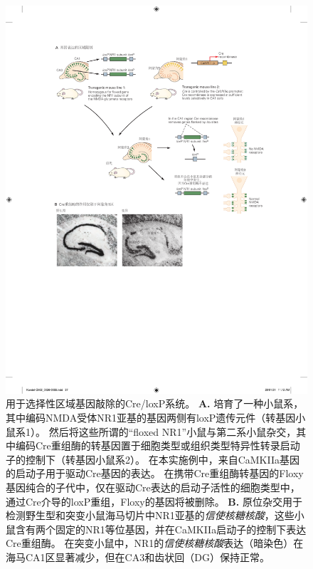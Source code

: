 \begin{figure}[htbp]
	\centering
	\includegraphics[width=0.8\linewidth]{chap02/fig_2_8}
	\caption{用于选择性区域基因敲除的Cre/loxP系统。
		\textbf{A.} 培育了一种小鼠系，其中编码NMDA受体NR1亚基的基因两侧有loxP遗传元件（转基因小鼠系1）。
		然后将这些所谓的“floxed NR1”小鼠与第二系小鼠杂交，其中编码Cre重组酶的转基因置于细胞类型或组织类型特异性转录启动子的控制下（转基因小鼠系2）。
		在本实施例中，来自CaMKIIa基因的启动子用于驱动Cre基因的表达。
		在携带Cre重组酶转基因的Floxy基因纯合的子代中，仅在驱动Cre表达的启动子活性的细胞类型中，通过Cre介导的loxP重组，Floxy的基因将被删除。
		\textbf{B.} 原位杂交用于检测野生型和突变小鼠海马切片中NR1亚基的\textit{信使核糖核酸}，这些小鼠含有两个固定的NR1等位基因，并在CaMKIIa启动子的控制下表达Cre重组酶。
		在突变小鼠中，NR1的\textit{信使核糖核酸}表达（暗染色）在海马CA1区显著减少，但在CA3和齿状回（DG）保持正常\cite{tsien1996essential}。}
	\label{fig:2_8}
\end{figure}



